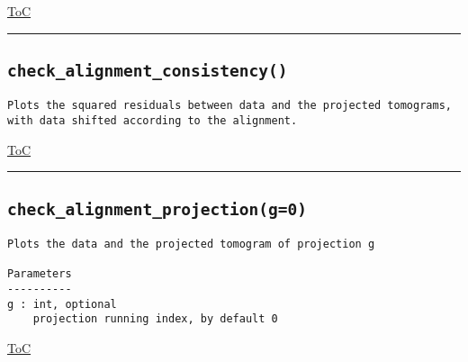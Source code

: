 \documentclass{article}
\begin{document}
\begin{flushright}

\hyperref[toc]{ToC}

\end{flushright}



\vspace{5mm}

\hrule

\subsection*{\texttt{check\_alignment\_consistency()}}
\label{fun:checkalignmentconsistency}

\begin{lstlisting}[language=docstring]
Plots the squared residuals between data and the projected tomograms,
with data shifted according to the alignment.
\end{lstlisting}

\begin{flushright}

\hyperref[toc]{ToC}

\end{flushright}



\vspace{5mm}

\hrule

\subsection*{\texttt{check\_alignment\_projection(g=0)}}
\label{fun:checkalignmentprojection}

\begin{lstlisting}[language=docstring]
Plots the data and the projected tomogram of projection g

Parameters
----------
g : int, optional
    projection running index, by default 0
\end{lstlisting}

\begin{flushright}

\hyperref[toc]{ToC}

\end{flushright}


\end{document}
